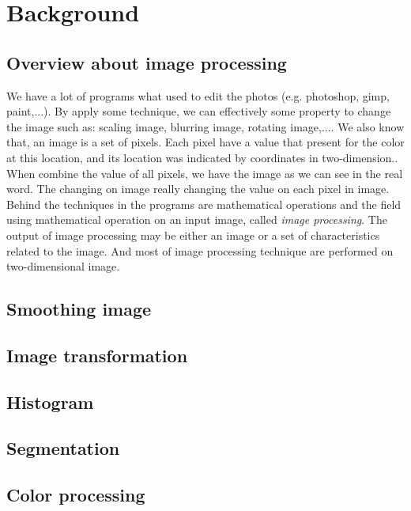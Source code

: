 \chapter{Background}
\section{Overview about image processing}
We have a lot of programs what used to edit the photos (e.g. photoshop, gimp, paint,...). By apply some technique, we can effectively some property to change the image such as: scaling image, blurring image, rotating image,.... We also know that, an image is a set of pixels. Each pixel have a value that present for the color at this location, and its location was indicated by coordinates in two-dimension.. When combine the value of all pixels, we have the image as we can see in the real word. The changing on image really changing the value on each pixel in image. Behind the techniques in the programs are mathematical operations and the field using mathematical operation on an input image,  called \textit{image processing}. The output of image processing may be either an image or a set of characteristics related to the image. And most of image processing technique are performed on two-dimensional image.
\section{Smoothing image}
\section{Image transformation}
\section{Histogram}
\section{Segmentation}
\section{Color processing}

